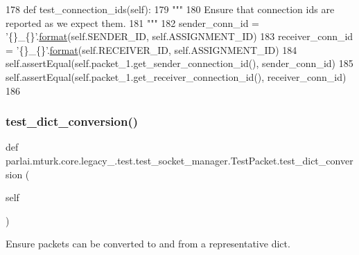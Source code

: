 \begin{DoxyCode}
178     \textcolor{keyword}{def }test\_connection\_ids(self):
179         \textcolor{stringliteral}{"""}
180 \textcolor{stringliteral}{        Ensure that connection ids are reported as we expect them.}
181 \textcolor{stringliteral}{        """}
182         sender\_conn\_id = \textcolor{stringliteral}{'\{\}\_\{\}'}.\hyperlink{namespaceparlai_1_1chat__service_1_1services_1_1messenger_1_1shared__utils_a32e2e2022b824fbaf80c747160b52a76}{format}(self.SENDER\_ID, self.ASSIGNMENT\_ID)
183         receiver\_conn\_id = \textcolor{stringliteral}{'\{\}\_\{\}'}.\hyperlink{namespaceparlai_1_1chat__service_1_1services_1_1messenger_1_1shared__utils_a32e2e2022b824fbaf80c747160b52a76}{format}(self.RECEIVER\_ID, self.ASSIGNMENT\_ID)
184         self.assertEqual(self.packet\_1.get\_sender\_connection\_id(), sender\_conn\_id)
185         self.assertEqual(self.packet\_1.get\_receiver\_connection\_id(), receiver\_conn\_id)
186 
\end{DoxyCode}
\mbox{\label{classparlai_1_1mturk_1_1core_1_1legacy__2018_1_1test_1_1test__socket__manager_1_1TestPacket_ac82c40c2b349723a7b0b938331a1a75e}} 
\subsubsection{\texorpdfstring{test\+\_\+dict\+\_\+conversion()}{test\_dict\_conversion()}}
{\footnotesize\ttfamily def parlai.\+mturk.\+core.\+legacy\+\_.\+test.\+test\+\_\+socket\+\_\+manager.\+Test\+Packet.\+test\+\_\+dict\+\_\+conversion (\begin{DoxyParamCaption}\item[{}]{self }\end{DoxyParamCaption})}

\begin{DoxyVerb}Ensure packets can be converted to and from a representative dict.
\end{DoxyVerb}
 

